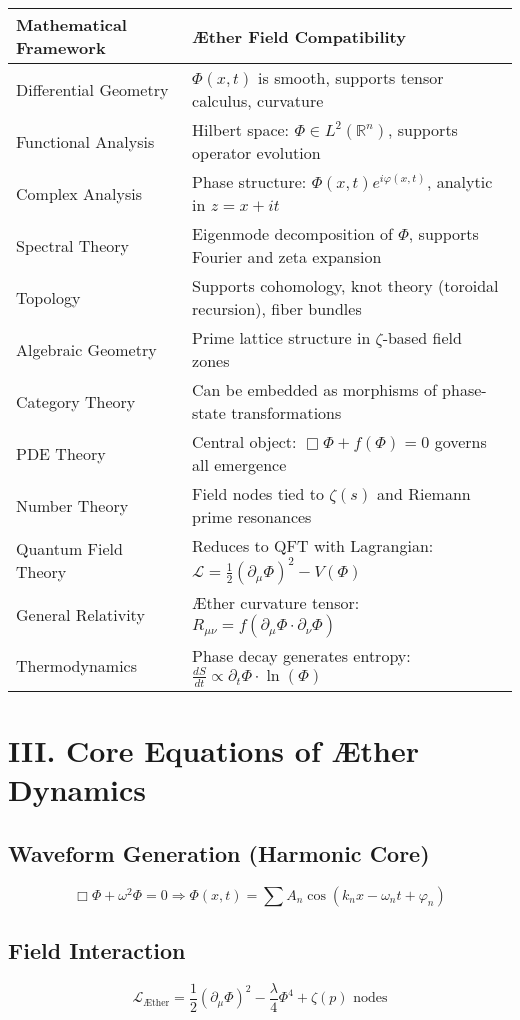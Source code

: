 \documentclass[12pt]{article}
\begin{document}
\begin{tabular}{@{}p{4cm}p{10cm}@{}}
\toprule
\textbf{Mathematical Framework} & \textbf{Æther Field Compatibility} \\
\midrule
Differential Geometry & $\Phi(x,t)$ is smooth, supports tensor calculus, curvature \\
Functional Analysis & Hilbert space: $\Phi \in L^2(\mathbb{R}^n)$, supports operator evolution \\
Complex Analysis & Phase structure: $\Phi(x,t)e^{i\varphi(x,t)}$, analytic in $z = x + it$ \\
Spectral Theory & Eigenmode decomposition of $\Phi$, supports Fourier and zeta expansion \\
Topology & Supports cohomology, knot theory (toroidal recursion), fiber bundles \\
Algebraic Geometry & Prime lattice structure in $\zeta$-based field zones \\
Category Theory & Can be embedded as morphisms of phase-state transformations \\
PDE Theory & Central object: $\Box \Phi + f(\Phi) = 0$ governs all emergence \\
Number Theory & Field nodes tied to $\zeta(s)$ and Riemann prime resonances \\
Quantum Field Theory & Reduces to QFT with Lagrangian: $\mathcal{L} = \frac{1}{2}(\partial_\mu \Phi)^2 - V(\Phi)$ \\
General Relativity & Æther curvature tensor: $R_{\mu\nu} = f(\partial_\mu \Phi \cdot \partial_\nu \Phi)$ \\
Thermodynamics & Phase decay generates entropy: $\frac{dS}{dt} \propto \partial_t \Phi \cdot \ln(\Phi)$ \\
\bottomrule
\end{tabular}

\section*{III. Core Equations of Æther Dynamics}

\subsection*{Waveform Generation (Harmonic Core)}
\[
\Box \Phi + \omega^2 \Phi = 0 \Rightarrow \Phi(x,t) = \sum A_n \cos(k_n x - \omega_n t + \varphi_n)
\]

\subsection*{Field Interaction}
\[
\mathcal{L}_\text{Æther} = \frac{1}{2}(\partial_\mu \Phi)^2 - \frac{\lambda}{4} \Phi^4 + \zeta(p) \text{ nodes}
\]
\end{document}
